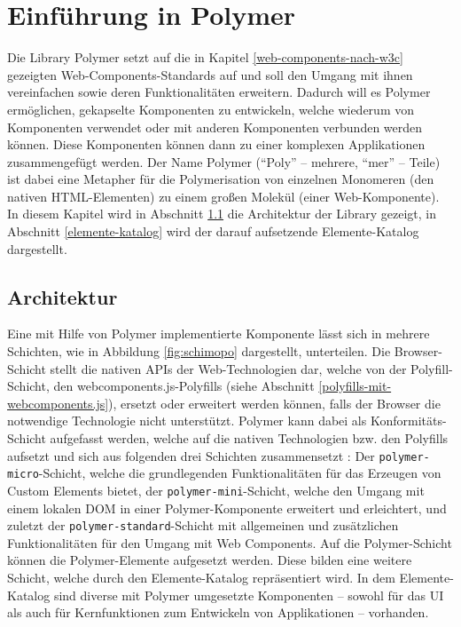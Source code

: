 \chapter{Einführung in Polymer}\label{einfuehrung-in-polymer}

Die Library Polymer setzt auf die in Kapitel \ref{web-components-nach-w3c} gezeigten Web-Components-Standards auf und soll den Umgang mit ihnen vereinfachen sowie deren Funktionalitäten erweitern. Dadurch will es Polymer ermöglichen, gekapselte Komponenten zu entwickeln, welche wiederum von Komponenten verwendet oder mit anderen Komponenten verbunden werden können. Diese Komponenten können dann zu einer komplexen Applikationen zusammengefügt werden. Der Name Polymer (``Poly'' -- mehrere, ``mer'' -- Teile) ist dabei eine Metapher für die Polymerisation von einzelnen Monomeren (den nativen \ac{HTML}-Elementen) zu einem großen Molekül (einer Web-Komponente). In diesem Kapitel wird in Abschnitt \ref{architektur} die Architektur der Library gezeigt, in Abschnitt \ref{elemente-katalog} wird der darauf aufsetzende Elemente-Katalog dargestellt.


\section{Architektur}\label{architektur}

Eine mit Hilfe von Polymer implementierte Komponente lässt sich in mehrere Schichten, wie in Abbildung \ref{fig:schimopo} dargestellt, unterteilen. Die Browser-Schicht stellt die nativen \ac{API}s der Web-Technologien dar, welche von der Polyfill-Schicht, den webcomponents.js-Polyfills (siehe Abschnitt \ref{polyfills-mit-webcomponents.js}), ersetzt oder erweitert werden können, falls der Browser die notwendige Technologie nicht unterstützt. Polymer kann dabei als Konformitäts-Schicht aufgefasst werden, welche auf die nativen Technologien bzw. den Polyfills aufsetzt und sich aus folgenden drei Schichten zusammensetzt \cite{citeulike:13915080}: Der \texttt{polymer-micro}-Schicht, welche die grundlegenden Funktionalitäten für das Erzeugen von Custom Elements bietet, der \texttt{polymer-mini}-Schicht, welche den Umgang mit einem lokalen \ac{DOM} in einer Polymer-Komponente erweitert und erleichtert, und zuletzt der \texttt{polymer-standard}-Schicht mit allgemeinen und zusätzlichen Funktionalitäten für den Umgang mit Web Components. Auf die Polymer-Schicht können die Polymer-Elemente aufgesetzt werden. Diese bilden eine weitere Schicht, welche durch den Elemente-Katalog \cite{citeulike:13916374} repräsentiert wird. In dem Elemente-Katalog sind diverse mit Polymer umgesetzte Komponenten -- sowohl für das \ac{UI} als auch für Kernfunktionen zum Entwickeln von Applikationen -- vorhanden.

